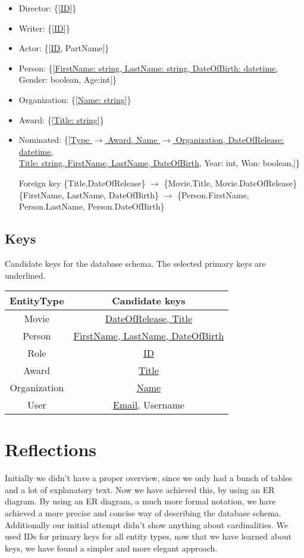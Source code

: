 \begin{itemize}
\item Director: \{[\underline{ID}]\}

\item Writer: \{[\underline{ID}]\}

\item Actor: \{[\underline{ID}, PartName]\}

\item Person: \{[\underline{FirstName: string, LastName: string, DateOfBirth: datetime,} Gender: boolean, Age:int]\}

\item Organization: \{[\underline{Name: string}]\}

\item Award: \{[\underline{Title: string}]\}

\item Nominated: \{[\underline{Type $ \rightarrow $ Award, Name $ \rightarrow $ Organization, DateOfRelease: datetime,}\\ \underline{Title: string, FirstName, LastName, DateOfBirth}, Year: int, Won: boolean,]\}

Foreign key \{Title,DateOfRelease\} $ \rightarrow $ \{Movie.Title, Movie.DateOfRelease\}
		\{FirstName, LastName, DateOfBirth\} $ \rightarrow $ \{Person.FirstName, Person.LastName, 
Person.DateOfBirth\}
\end{itemize}

\subsection{Keys}

Candidate keys for the database schema.
The selected primary keys are underlined.

\begin{center}
\begin{tabular}{| c | c |}
\hline
EntityType & Candidate keys\\
\hline 
\hline
Movie & \underline{DateOfRelease, Title}\\
\hline
Person & \underline{FirstName, LastName, DateOfBirth}\\
\hline
Role & \underline{ID}\\
\hline
\hline 
Award & \underline{Title}\\
\hline
Organization & \underline{Name}\\
\hline
User & \underline{Email}, Username\\
\hline
\end{tabular}
\end{center}

\section{Reflections}
Initially we didn't have a proper overview, since we only had a bunch of tables and a lot of explanatory text.
Now we have achieved this, by using an ER diagram.
By using an ER diagram, a much more formal notation, we have achieved a more precise and concise way of describing the database schema.
Additionally our initial attempt didn't show anything about cardinalities.
We used IDs for primary keys for all entity types, now that we have learned about keys, we have found a simpler and more elegant approach.
